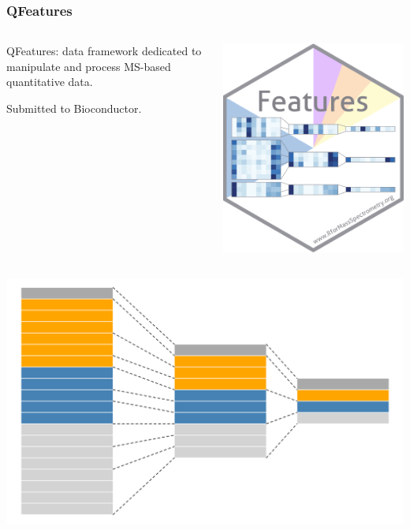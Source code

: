 \documentclass{beamer}
\newcommand{\frametitlesection}[1]{\frametitle{\centering #1 \footnotesize \hspace{0pt plus 1 filll} \insertsection}}
\begin{document}
\begin{frame}
    \frametitlesection{QFeatures}
    
    \centering
    
    \begin{columns}
        \begin{column}{0.8\textwidth}
            QFeatures: data framework dedicated to manipulate and process 
            MS-based quantitative data. 
            
            Submitted to Bioconductor.
        \end{column}
        \begin{column}{0.2\textwidth}
            \includegraphics[width=\linewidth]{figs/sticker_QFeatures.png}
        \end{column}
        
    \end{columns}
    
    \includegraphics[width=0.8\linewidth]{figs/QFeatures.png}
    
\end{frame}
\end{document}
